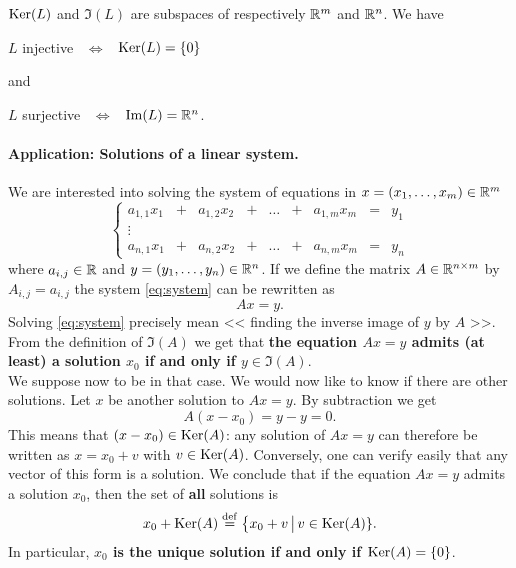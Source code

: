 \documentclass[11pt,nocut]{article}
\begin{document}
\begin{proposition}\label{prop:inj_sur}
	${{\rm Ker}}(L)$ and $\Im(L)$ are subspaces of respectively $\mathbb{R}^m$ and $\mathbb{R}^n$. We have
	\begin{center}
		$L$ injective \ $\Longleftrightarrow$ \ ${{\rm Ker}}(L) = \{0 \}$
	\end{center}
	and
	\begin{center}
		$L$ surjective \ $\Longleftrightarrow$ \ ${{\rm Im}}(L) = \mathbb{R}^n$.
	\end{center}
\end{proposition}

\paragraph{Application: Solutions of a linear system.}
We are interested into solving the system of equations in $x = (x_1, \dots, x_m) \in \mathbb{R}^m$
\begin{equation}\label{eq:system}
	\left\{
		\begin{array}{ccccccccc}
		a_{1,1} x_1 &+& a_{1,2} x_2 &+& \dots &+& a_{1,m} x_m &=& y_1 \\
		\vdots &&&&&&&& \\
		a_{n,1} x_1 &+& a_{n,2} x_2 &+& \dots &+& a_{n,m} x_m &=& y_n
	\end{array}
	\right.
\end{equation}
where $a_{i,j} \in \mathbb{R}$ and $y = (y_1, \dots, y_n) \in \mathbb{R}^n$. If we define the matrix $A \in \mathbb{R}^{n \times m}$ by $A_{i,j} = a_{i,j}$ the system \eqref{eq:system} can be rewritten as
$$
A x = y.
$$
Solving \eqref{eq:system} precisely mean << finding the inverse image of $y$ by $A$ >>. From the definition of $\Im(A)$ we get that 
\textbf{the equation $Ax = y$ admits (at least) a solution $x_0$ if and only if $y \in \Im(A)$}.
\\

We suppose now to be in that case. We would now like to know if there are other solutions. Let $x$ be another solution to $Ax = y$. By subtraction we get 
$$
A(x - x_0) = y - y = 0.
$$
This means that $(x - x_0) \in {{\rm Ker}}(A)$: any solution of $Ax = y$ can therefore be written as $x = x_0 + v$ with $v \in {{\rm Ker}}(A)$. Conversely, one can verify easily that any vector of this form is a solution. We conclude that if the equation $Ax = y$ admits a solution $x_0$, then the set of \textbf{all} solutions is
$$
x_0 + {{\rm Ker}}(A) \overset{\rm def}{=} \big\{ x_0 + v \, \big| \, v \in {{\rm Ker}}(A) \}.
$$
In particular, \textbf{$x_0$ is the unique solution if and only if ${{\rm Ker}}(A) = \{0\}$}.



	\vspace{1cm}
	\centerline{}

%
%
\end{document}
